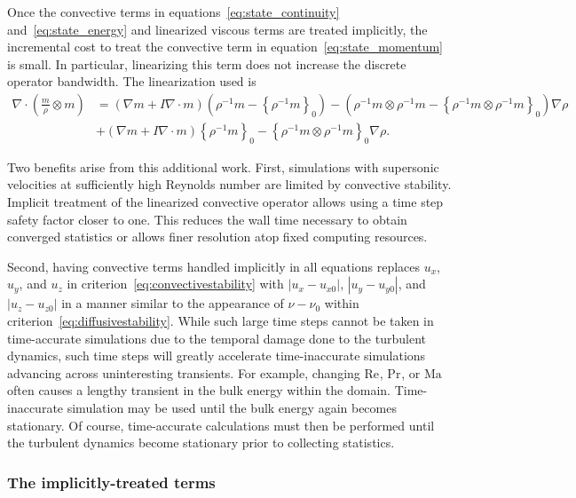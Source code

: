 \documentclass[letterpaper,11pt,nointlimits,reqno,draft]{amsart}
\newcommand{\Mach}[1][]{\ensuremath{\mbox{Ma}_{#1}}}
\newcommand{\Reynolds}[1][]{\ensuremath{\mbox{Re}_{#1}}}
\newcommand{\Prandtl}[1][]{\ensuremath{\mbox{Pr}_{#1}}}
\newcommand{\reference}[1]{\ensuremath{\left\{#1\right\}_{0}}}
\newcommand{\lessreference}[1]
  {\ensuremath{\left({#1}-\reference{#1}\right)}}
\begin{document}
Once the convective terms in equations~\eqref{eq:state_continuity}
and~\eqref{eq:state_energy} and linearized viscous terms are treated
implicitly, the incremental cost to treat the convective term in
equation~\eqref{eq:state_momentum} is small.  In particular, linearizing this
term does not increase the discrete operator bandwidth.  The linearization used
is
\begin{align}
  \nabla\cdot\left(\frac{m}{\rho}\otimes{}m\right)
&=
    \left(\nabla{}m + I \nabla\cdot{}m\right)\lessreference{\rho^{-1}m}
  - \lessreference{\rho^{-1}m\otimes\rho^{-1}m}\nabla\rho
\\
 &+ \left(\nabla{}m + I \nabla\cdot{}m\right)\reference{\rho^{-1}m}
  - \reference{\rho^{-1}m\otimes\rho^{-1}m}\nabla\rho
  .
\end{align}

Two benefits arise from this additional work.  First, simulations with
supersonic velocities at sufficiently high Reynolds number are limited by
convective stability.  Implicit treatment of the linearized convective operator
allows using a time step safety factor closer to one.  This reduces the wall
time necessary to obtain converged statistics or allows finer resolution atop
fixed computing resources.

Second, having convective terms handled implicitly in all equations replaces
$u_x$, $u_y$, and $u_z$ in criterion~\eqref{eq:convectivestability} with
$\left|u_x-u_{x0}\right|$, $\left|u_y-u_{y0}\right|$, and
$\left|u_z-u_{z0}\right|$ in a manner similar to the appearance of $\nu-\nu_0$
within criterion~\eqref{eq:diffusivestability}.  While such large time steps
cannot be taken in time-accurate simulations due to the temporal damage done to
the turbulent dynamics, such time steps will greatly accelerate time-inaccurate
simulations advancing across uninteresting transients.  For example, changing
$\Reynolds$, $\Prandtl$, or $\Mach$ often causes a lengthy transient in the
bulk energy within the domain.  Time-inaccurate simulation may be used until
the bulk energy again becomes stationary.  Of course, time-accurate
calculations must then be performed until the turbulent dynamics become
stationary prior to collecting statistics.

\subsubsection{The implicitly-treated terms}
\label{sec:implicitlytreatedterms}
\end{document}
